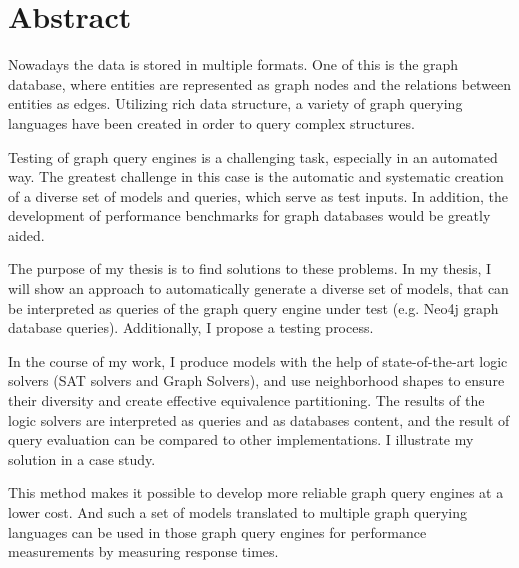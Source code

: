 \chapter*{Abstract}

Nowadays the data is stored in multiple formats. One of this is the graph database, where entities are represented as graph nodes and the relations between entities as edges. Utilizing rich data structure, a variety of graph querying languages have been created in order to query complex structures.

Testing of graph query engines is a challenging task, especially in an automated way. The greatest challenge in this case is the automatic and systematic creation of a diverse set of models and queries, which serve as test inputs. In addition, the development of performance benchmarks for graph databases would be greatly aided.

The purpose of my thesis is to find solutions to these problems.  In my thesis, I will show an approach to automatically generate a diverse set of models, that can be interpreted as queries of the graph query engine under test (e.g. Neo4j graph database queries). Additionally, I propose a testing process.

In the course of my work, I produce models with the help of state-of-the-art logic solvers (SAT solvers and Graph Solvers), and use neighborhood shapes to ensure their diversity and create effective equivalence partitioning. The results of the logic solvers are interpreted as queries and as databases content, and the result of query evaluation can be compared to other implementations. I illustrate my solution in a case study.

This method makes it possible to develop more reliable graph query engines at a lower cost. And such a set of models translated to multiple graph querying languages can be used in those graph query engines for performance measurements by measuring response times.


\vfill
\selectthesislanguage

\setcounter{romanPage}{\value{page}}
